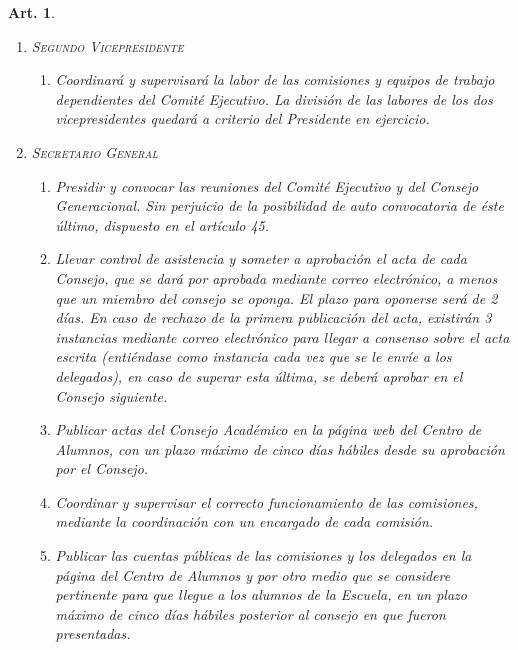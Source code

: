 \documentclass[letterpaper,11pt]{article}
\theoremstyle{plain}
\newtheorem{art}{Art.} %
\begin{document}
\begin{art}
\begin{enumerate}
\begin{enumerate}
						\item Coordinará y supervisará la labor de las comisiones y equipos de trabajo dependientes del Comité Ejecutivo. La división de las labores de los dos vicepresidentes quedará a criterio del Presidente en ejercicio.
					\end{enumerate}

				\item \textsc{Segundo Vicepresidente}
					\begin{enumerate}
						\item Coordinará y supervisará la labor de las comisiones y equipos de trabajo dependientes del Comité Ejecutivo. La división de las labores de los dos vicepresidentes quedará a criterio del Presidente en ejercicio.
					\end{enumerate}

				\item \textsc{Secretario General}
					\begin{enumerate}
						\item Presidir y convocar las reuniones del Comité Ejecutivo y del Consejo Generacional. Sin
						perjuicio de la posibilidad de auto convocatoria de éste último, dispuesto en el artículo 45.
						
						\item Llevar control de asistencia y someter a aprobación el acta de cada Consejo, que se dará por aprobada mediante correo electrónico, a menos que un miembro del consejo se oponga. El plazo para oponerse será de 2 días. En caso de rechazo de la primera publicación del acta,
						existirán 3 instancias mediante correo electrónico para llegar a consenso sobre el acta escrita (entiéndase como instancia cada vez que se le envíe a los delegados), en caso de superar esta última, se deberá aprobar en el Consejo siguiente.
						
						\item Publicar actas del Consejo Académico en la página web del Centro de Alumnos, con un plazo máximo de cinco días hábiles desde su aprobación por el Consejo.
						
						\item Coordinar y supervisar el correcto funcionamiento de las comisiones, mediante la coordinación con un encargado de cada comisión.
						
						\item Publicar las cuentas públicas de las comisiones y los delegados en la página del Centro de Alumnos y por otro medio que se considere pertinente para que llegue a los alumnos de la Escuela, en un plazo máximo de cinco días hábiles posterior al consejo en que fueron presentadas.
					\end{enumerate}


\end{enumerate}
\end{art}
\end{document}
